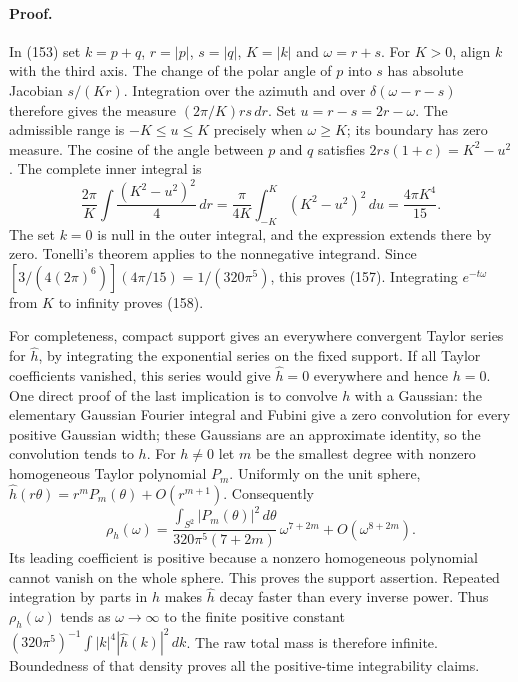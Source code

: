 \documentclass[11pt]{article}
\begin{document}
\paragraph{Proof.}
In (153) set $k=p+q$, $r=|p|$,
$s=|q|$, $K=|k|$ and $\omega=r+s$. For $K>0$, align $k$ with
the third axis. The change of the polar angle of $p$ into $s$
has absolute Jacobian $s/(Kr)$. Integration over the azimuth and
over $\delta(\omega-r-s)$ therefore gives the measure
$(2\pi/K)rs\,dr$. Set $u=r-s=2r-\omega$. The admissible range
is $-K\le u\le K$ precisely when $\omega\ge K$; its boundary
has zero measure. The cosine of the angle between $p$ and $q$
satisfies $2rs(1+c)=K^2-u^2$. The complete inner integral is
\[
 \frac{2\pi}{K}\int \frac{ (K^2-u^2)^2}{4}\,dr
 = \frac{\pi}{4K}\int_{-K}^K(K^2-u^2)^2\,du
 = \frac{4\pi K^4}{15}.
\]
The set $k=0$ is null in the outer integral, and the expression
extends there by zero. Tonelli's theorem applies to the
nonnegative integrand. Since
$[3/(4(2\pi)^6)](4\pi/15)=1/(320\pi^5)$, this proves
(157). Integrating $e^{-t\omega}$ from $K$
to infinity proves (158).

For completeness, compact support gives an everywhere convergent
Taylor series for $\widehat h$, by integrating the exponential
series on the fixed support. If all Taylor coefficients vanished,
this series would give $\widehat h=0$ everywhere and hence $h=0$.
One direct proof of the last implication is to convolve $h$ with
a Gaussian: the elementary Gaussian Fourier integral and Fubini
give a zero convolution for every positive Gaussian width; these
Gaussians are an approximate identity, so the convolution tends
to $h$. For $h\ne0$ let $m$ be the smallest degree with nonzero
homogeneous Taylor polynomial $P_m$. Uniformly on the unit sphere,
$\widehat h(r\theta)=r^mP_m(\theta)+O(r^{m+1})$.
Consequently
\begin{equation}\label{eq:full-small-energy}
 \rho_h(\omega)=
 \frac{\int_{S^2}|P_m(\theta)|^2\,d\theta}
       {320\pi^5(7+2m)}\,\omega^{7+2m}
       +O(\omega^{8+2m}).
\end{equation}
Its leading coefficient is positive because a nonzero homogeneous
polynomial cannot vanish on the whole sphere. This proves the
support assertion. Repeated integration by parts in $h$ makes
$\widehat h$ decay faster than every inverse power. Thus
$\rho_h(\omega)$ tends as $\omega\to\infty$ to the finite
positive constant
$(320\pi^5)^{-1}\int |k|^4|\widehat h(k)|^2\,dk$.
The raw total mass is therefore infinite. Boundedness of that
density proves all the positive-time integrability claims.
\end{document}

